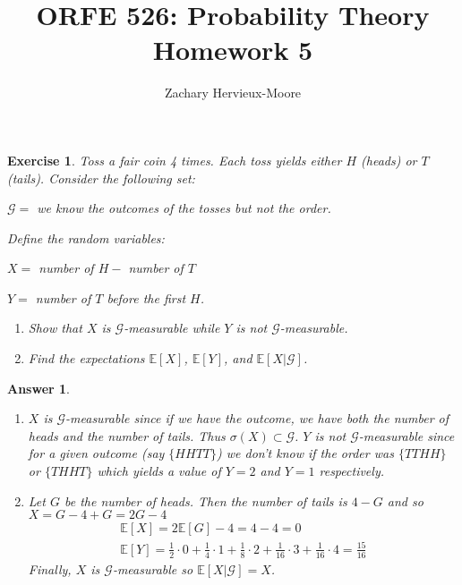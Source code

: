 \documentclass[12pt]{article}
\title{ORFE 526: Probability Theory \\ Homework 5}
\author{Zachary Hervieux-Moore}
\date{\displaydate{date}}
\theoremstyle{colon}
\newtheorem{exercise}{Exercise}
\newtheorem*{answer}{Answer}
\begin{document}
\maketitle

\clearpage

\begin{exercise}
  Toss a fair coin 4 times. Each toss yields either $H$ (heads) or $T$ (tails). Consider the following set:

  $\mathcal{G} = $ we know the outcomes of the tosses but not the order.

  Define the random variables:

  $X = $ number of $H - $ number of $T$

  $Y = $ number of $T$ before the first $H$.

  \begin{enumerate}[label=\roman*)]
    \item Show that $X$ is $\mathcal{G}$-measurable while $Y$ is not $\mathcal{G}$-measurable.
    \item Find the expectations $\mathbb{E}[X]$, $\mathbb{E}[Y]$, and $\mathbb{E}[X | \mathcal{G}]$.
  \end{enumerate}
\end{exercise}

\begin{answer}
  \leavevmode
  \begin{enumerate}[label=\roman*)]
    \item $X$ is $\mathcal{G}$-measurable since if we have the outcome, we have both the number of heads and the number of tails. Thus $\sigma(X) \subset \mathcal{G}$. $Y$ is not $\mathcal{G}$-measurable since for a given outcome (say $\{HHTT\}$) we don't know if the order was $\{TTHH\}$ or $\{THHT\}$ which yields a value of $Y = 2$ and $Y = 1$ respectively.
    \item Let $G$ be the number of heads. Then the number of tails is $4 - G$ and so $X = G - 4 + G = 2G - 4$
      \begin{gather*}
        \mathbb{E}[X] = 2 \mathbb{E}[G] - 4 = 4 - 4 = 0 \\
        \mathbb{E}[Y] = \frac{1}{2} \cdot 0 + \frac{1}{4} \cdot 1 + \frac{1}{8} \cdot 2 + \frac{1}{16} \cdot 3 + \frac{1}{16} \cdot 4 = \frac{15}{16}
      \end{gather*}
      Finally, $X$ is $\mathcal{G}$-measurable so $\mathbb{E}[X|\mathcal{G}] = X$.
  \end{enumerate}
\end{answer}
\end{document}
